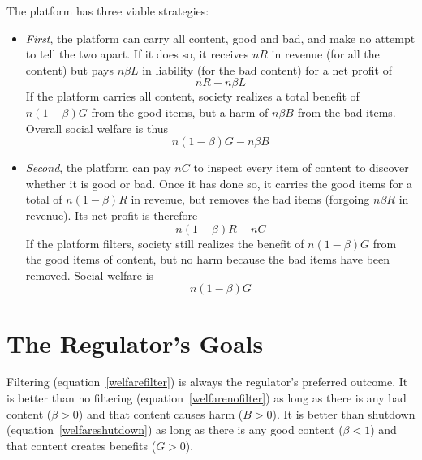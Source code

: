 

\iffalse


The platform has three viable strategies:
\begin{itemize}

\item  \emph{First}, the platform can carry all content, good and bad, and make no attempt to tell the two apart. If it does so, it receives $nR$ in revenue (for all the content) but pays $n\beta L$ in liability (for the bad content) for a net profit of
\begin{equation}
\label{profitnofilter}
nR - n\beta L
\end{equation}
If the platform carries all content, society realizes a total benefit of $n(1-\beta)G$ from the good items, but a harm of $n\beta B$ from the bad items. Overall social welfare is thus
\begin{equation}
\label{welfarenofilter}
n(1-\beta)G - n \beta B
\end{equation}


\item \emph{Second}, the platform can pay $nC$ to inspect every item of content to discover whether it is good or bad. Once it has done so, it carries the good items for a total of $n(1-\beta)R$ in revenue, but removes the bad items (forgoing $n\beta R$ in revenue). Its net profit is therefore 
\begin{equation}
\label{profitfilter}
n(1 - \beta)R - nC    
\end{equation}
If the platform filters, society still realizes the benefit of  $n(1-\beta)G$ from the good items of content, but no harm because the bad items have been removed. Social welfare is
\begin{equation}
\label{welfarefilter}
n(1-\beta)G
\end{equation}


\end{itemize}

\section{The Regulator's Goals}

Filtering (equation~\ref{welfarefilter}) is always the regulator's preferred outcome. It is better than no filtering (equation~\ref{welfarenofilter}) as long as there is any bad content ($\beta > 0$) and that content causes harm ($B > 0$). It is better than shutdown (equation~\ref{welfareshutdown}) as long as there is any good content ($\beta < 1$) and that content creates benefits ($G > 0$).

